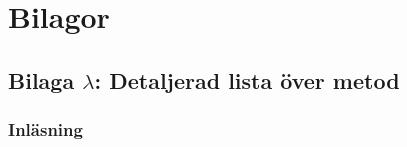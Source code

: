 \documentclass[12pt,a4paper]{article}
\begin{document}
\newpage
{}

 


\newpage
\section*{Bilagor}
\label{sec:bilaga}

\subsection*{Bilaga $\lambda$: Detaljerad lista över metod}

\subsubsection*{Inläsning}
\end{document}
